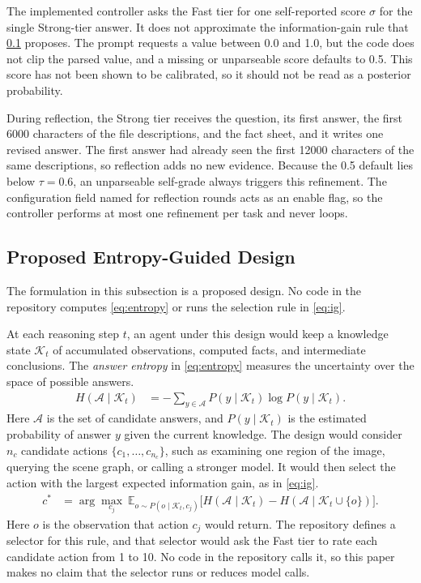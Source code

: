 \documentclass{article}
\newcommand{\E}{\mathbb{E}}
\begin{document}
The implemented controller asks the Fast tier for one self-reported score $\sigma$ for the single Strong-tier answer. It does not approximate the information-gain rule that \cref{sec:proposed} proposes. The prompt requests a value between 0.0 and 1.0, but the code does not clip the parsed value, and a missing or unparseable score defaults to 0.5. This score has not been shown to be calibrated, so it should not be read as a posterior probability.

During reflection, the Strong tier receives the question, its first answer, the first \num{6000} characters of the file descriptions, and the fact sheet, and it writes one revised answer. The first answer had already seen the first \num{12000} characters of the same descriptions, so reflection adds no new evidence. Because the 0.5 default lies below $\tau = 0.6$, an unparseable self-grade always triggers this refinement. The configuration field named for reflection rounds acts as an enable flag, so the controller performs at most one refinement per task and never loops.

\FloatBarrier
\subsection{Proposed Entropy-Guided Design}
\label{sec:proposed}

The formulation in this subsection is a proposed design. No code in the repository computes \cref{eq:entropy} or runs the selection rule in \cref{eq:ig}.

At each reasoning step $t$, an agent under this design would keep a knowledge state $\mathcal{K}_t$ of accumulated observations, computed facts, and intermediate conclusions. The \emph{answer entropy} in \cref{eq:entropy} measures the uncertainty over the space of possible answers.
\begin{align}
  H(\mathcal{A} \mid \mathcal{K}_t) &= -\sum_{y \in \mathcal{A}} P(y \mid \mathcal{K}_t) \log P(y \mid \mathcal{K}_t). \label{eq:entropy}
\end{align}
Here $\mathcal{A}$ is the set of candidate answers, and $P(y \mid \mathcal{K}_t)$ is the estimated probability of answer $y$ given the current knowledge. The design would consider $n_c$ candidate actions $\{c_1, \ldots, c_{n_c}\}$, such as examining one region of the image, querying the scene graph, or calling a stronger model. It would then select the action with the largest expected information gain, as in \cref{eq:ig}.
\begin{align}
  c^* &= \arg\max_{c_j} \ \E_{o \sim P(o \mid \mathcal{K}_t, c_j)}\bigl[ H(\mathcal{A} \mid \mathcal{K}_t) - H(\mathcal{A} \mid \mathcal{K}_t \cup \{o\}) \bigr]. \label{eq:ig}
\end{align}
Here $o$ is the observation that action $c_j$ would return. The repository defines a selector for this rule, and that selector would ask the Fast tier to rate each candidate action from 1 to 10. No code in the repository calls it, so this paper makes no claim that the selector runs or reduces model calls.
\end{document}
